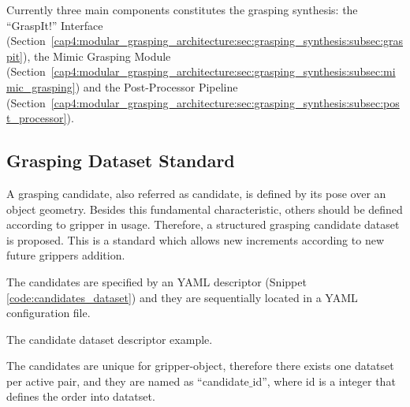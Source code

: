 Currently three main components constitutes the grasping synthesis: the ``GraspIt!'' Interface (Section~\ref{cap4:modular_grasping_architecture:sec:grasping_synthesis:subsec:graspit}), the Mimic Grasping Module (Section~\ref{cap4:modular_grasping_architecture:sec:grasping_synthesis:subsec:mimic_grasping}) and the Post-Processor Pipeline (Section~\ref{cap4:modular_grasping_architecture:sec:grasping_synthesis:subsec:post_processor}). 

\subsection{Grasping Dataset Standard}
\label{cap4:modular_grasping_architecture:sec:grasping_dataset}

A grasping candidate, also referred as candidate, is defined by its pose over an object geometry. Besides this fundamental characteristic, others should be defined according to gripper in usage. Therefore, a structured grasping candidate dataset is proposed. This is a standard which allows new increments according to new future grippers addition.

The candidates are specified by an YAML descriptor (Snippet \ref{code:candidates_dataset}) and they are sequentially located in a YAML configuration file. %

\begin{snippet}[h!]
	\centering
	\caption{The candidate dataset descriptor example.}
	\label{code:candidates_dataset}
\end{snippet}

The candidates are unique for gripper-object, therefore there exists one datatset per active pair, and they are named as ``candidate$\_$id'', where id is a integer that defines the order into datatset. 

